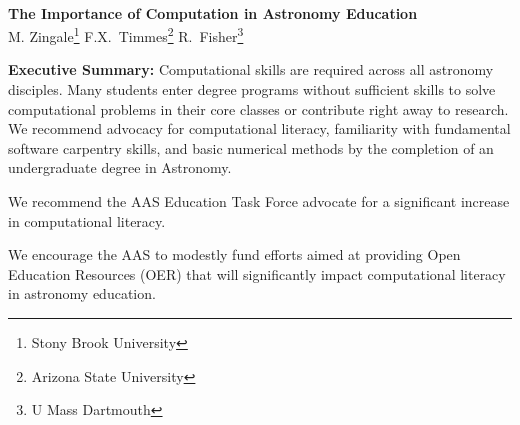 \documentclass[11pt]{article}
\begin{document}
\thispagestyle{plain}

\mbox{ }\vspace{-0.7in}

\begin{center}
{\Large \sffamily \bfseries The Importance of Computation in Astronomy Education} \\
{
M. Zingale\footnote{Stony Brook University}
F.X.~Timmes\footnote{Arizona State University}
R.~Fisher\footnote{U Mass Dartmouth}
}
\end{center}

\begin{tcolorbox}
{\sffamily \bfseries Executive Summary:} Computational skills are required
across all astronomy disciples. 
Many students enter degree programs without sufficient skills
to solve computational problems in their core classes or contribute right away to research. 
We recommend advocacy for computational literacy, familiarity with fundamental
software carpentry skills, and basic numerical methods by the
completion of an undergraduate degree in Astronomy.  

\vspace {0.1in} We recommend the AAS Education Task Force advocate for
a significant increase in computational literacy.

\vspace {0.1in} We encourage the AAS to modestly fund efforts aimed at
providing Open Education Resources (OER) that will significantly
impact computational literacy in astronomy education.






\end{tcolorbox}
\end{document}
